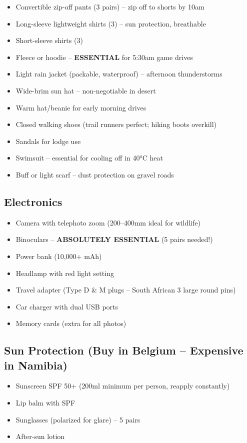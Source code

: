 \documentclass[11pt]{article}
\begin{document}
\begin{itemize}
    \item Convertible zip-off pants (3 pairs) -- zip off to shorts by 10am
    \item Long-sleeve lightweight shirts (3) -- sun protection, breathable
    \item Short-sleeve shirts (3)
    \item Fleece or hoodie -- \textbf{ESSENTIAL} for 5:30am game drives
    \item Light rain jacket (packable, waterproof) -- afternoon thunderstorms
    \item Wide-brim sun hat -- non-negotiable in desert
    \item Warm hat/beanie for early morning drives
    \item Closed walking shoes (trail runners perfect; hiking boots overkill)
    \item Sandals for lodge use
    \item Swimsuit -- essential for cooling off in 40°C heat
    \item Buff or light scarf -- dust protection on gravel roads
\end{itemize}

\subsection{Electronics}

\begin{itemize}
    \item Camera with telephoto zoom (200--400mm ideal for wildlife)
    \item Binoculars -- \textbf{ABSOLUTELY ESSENTIAL} (5 pairs needed!)
    \item Power bank (10,000+ mAh)
    \item Headlamp with red light setting
    \item Travel adapter (Type D \& M plugs -- South African 3 large round pins)
    \item Car charger with dual USB ports
    \item Memory cards (extra for all photos)
\end{itemize}

\subsection{Sun Protection (Buy in Belgium -- Expensive in Namibia)}

\begin{itemize}
    \item Sunscreen SPF 50+ (200ml minimum per person, reapply constantly)
    \item Lip balm with SPF
    \item Sunglasses (polarized for glare) -- 5 pairs
    \item After-sun lotion
\end{itemize}
\end{document}
